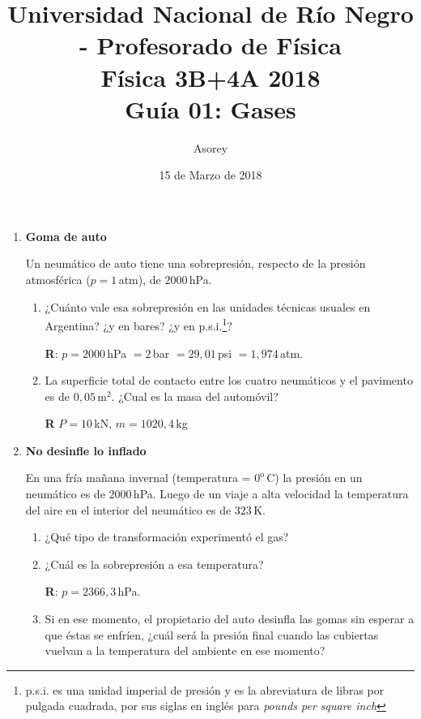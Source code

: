 \documentclass[a4paper,12pt]{article}
\begin{document}
\title{
{\normalsize{Universidad Nacional de Río Negro - Profesorado de Física}}\\
Física 3B+4A  2018 \\ Guía 01: Gases}
\author{Asorey}
\date{15 de Marzo de 2018}
\maketitle

\begin{enumerate}
	\setcounter{enumi}{0}      %

	\item {\bf{Goma de auto}}
		
		Un neumático de auto tiene una sobrepresión, respecto de la presión
		atmosférica ($p=1$\,atm), de $2000$\,hPa.
		\begin{enumerate}
			\item ¿Cuánto vale esa sobrepresión en las unidades técnicas usuales en
				Argentina? ¿y en bares? ¿y en p.s.i.\footnote{p.s.i. es una
				unidad imperial de presión y es la abreviatura de libras por
				pulgada cuadrada, por sus siglas en inglés para {\textit{pounds
				per square inch}}}? 
				
				{\bf R}: $p=2000$\,hPa $= 2$\,bar $= 29,01$\,psi $= 1,974$\,atm.
			\item La superficie total de contacto entre los cuatro neumáticos y
				el pavimento es de $0,05$\,m$^2$. ¿Cual es la masa del
				automóvil?
				
				{\bf R} $P = 10$\,kN, $m=1020,4$\,kg
		\end{enumerate}
	
	\item {\bf{No desinfle lo inflado}}
		
		En una fría mañana invernal (temperatura = $0^\mathrm{o}$\,C) la
		presión en un neumático es de $2000$\,hPa. Luego de un viaje a alta
		velocidad la temperatura del aire en el interior del neumático es de
		$323$\,K.
		\begin{enumerate}
			\item ¿Qué tipo de transformación experimentó el gas?
			\item ¿Cuál es la sobrepresión a esa temperatura?

				{\bf R}: $p=2366,3$\,hPa.
			\item Si en ese momento, el propietario del auto desinfla las gomas
				sin esperar a que éstas se enfríen, ¿cuál será la presión final
				cuando las cubiertas vuelvan a la temperatura del ambiente en
				ese momento?


\end{enumerate}
\end{enumerate}
\end{document}
